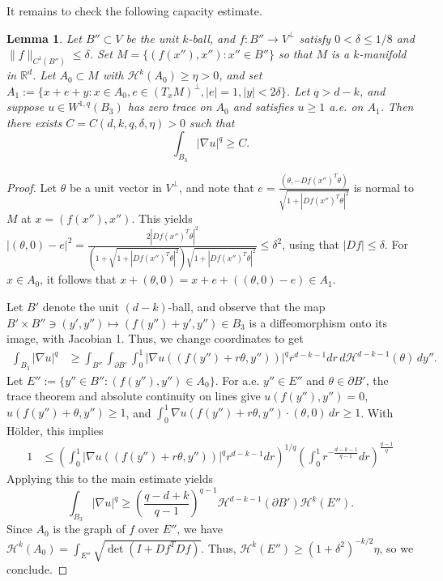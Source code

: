 \documentclass[11pt]{amsart}
\numberwithin{equation}{section}
\numberwithin{figure}{section}
\theoremstyle{plain}
\newtheorem{lem}[thm]{Lemma}
\theoremstyle{definition}
\theoremstyle{remark}
\theoremstyle{plain}
\def\R{\mathbb{R}}
\begin{document}
It remains to check the following capacity estimate.
\begin{lem}\label{lem:cylindrical-q-capacity-est}
     Let $B''\subset V$ be the unit $k$-ball, and $f: B''\to V^\perp$ satisfy $0<\delta\leq1/8$ and $\|f\|_{C^1(B'')}\leq\delta$. Set $M = \{ (f(x''),x'') : x''\in B''\}$ so that $M$ is a $k$-manifold in $\R^d$. Let $A_0 \subset M$ with $\mathcal{H}^k(A_0) \geq \eta > 0$, and set $A_1 := \{ x + e + y : x\in A_0, e\in (T_xM)^\perp, |e| = 1, |y| < 2\delta \}$. Let $q>d-k$, and suppose $u\in W^{1,q}(B_3)$ has zero trace on $A_0$ and satisfies $u\geq1$ a.e. on $A_1$. Then there exists $C=C(d,k,q,\delta,\eta)>0$ such that
    \[ \int_{B_3} |\nabla u|^q \geq C. \]
\end{lem}
\begin{proof}
    Let $\theta$ be a unit vector in $V^\perp$, and note that $e = \frac{(\theta,-Df(x'')^T\theta)}{\sqrt{1 + |Df(x'')^T\theta|^2}}$ is normal to $M$ at $x=(f(x''),x'')$. This yields $|(\theta,0) - e|^2 = \frac{2|Df(x'')^T\theta|^2}{(1 + \sqrt{1 + |Df(x'')^T\theta|^2})\sqrt{1 + |Df(x'')^T\theta|^2}} \leq \delta^2$, using that $|Df|\leq \delta$. For $x\in A_0$, it follows that $x + (\theta,0) = x + e + ((\theta,0) - e)\in A_1$.

    Let $B'$ denote the unit $(d-k)$-ball, and observe that the map $B'\times B''\ni (y', y'')\mapsto (f(y'') + y', y'')\in B_3$ is a diffeomorphism onto its image, with Jacobian 1. Thus, we change coordinates to get
    \begin{align*}
        \int_{B_3} |\nabla u|^q &\geq \int_{B''} \int_{\partial B'}\int_0^1 |\nabla u((f(y'') + r\theta, y''))|^q r^{d-k-1}dr\, d\mathcal{H}^{d-k-1}(\theta)\,dy''.
    \end{align*}
    Let $E'' := \{ y''\in B'' : (f(y''), y'') \in A_0 \}$. For a.e. $y''\in E''$ and $\theta\in\partial B'$, the trace theorem and absolute continuity on lines give $u(f(y''),y'')=0$, $u(f(y'')+\theta,y'')\geq1$, and $\int_0^1 \nabla u(f(y'')+r\theta,y'')\cdot(\theta,0)\,dr\geq1$. With H\"older, this implies
    \begin{align*}
        1 &\leq \left( \int_0^1|\nabla u((f(y'') + r\theta, y''))|^q r^{d-k-1}dr \right)^{1/q}\left(\int_0^1 r^{-\frac{d-k-1}{q-1}}dr\right)^{\frac{q-1}{q}}
    \end{align*}
    Applying this to the main estimate yields
    \[ \int_{B_3} |\nabla u|^q \geq \left(\frac{q-d+k}{q - 1}\right)^{q-1}\mathcal{H}^{d-k-1}(\partial B')\mathcal{H}^k(E''). \]
    Since $A_0$ is the graph of $f$ over $E''$, we have $\mathcal{H}^k(A_0) = \int_{E''} \sqrt{\det(I + Df^TDf)}$. Thus, $\mathcal{H}^k(E'') \geq (1 + \delta^2)^{-k/2}\eta$, so we conclude.
\end{proof}
\end{document}
